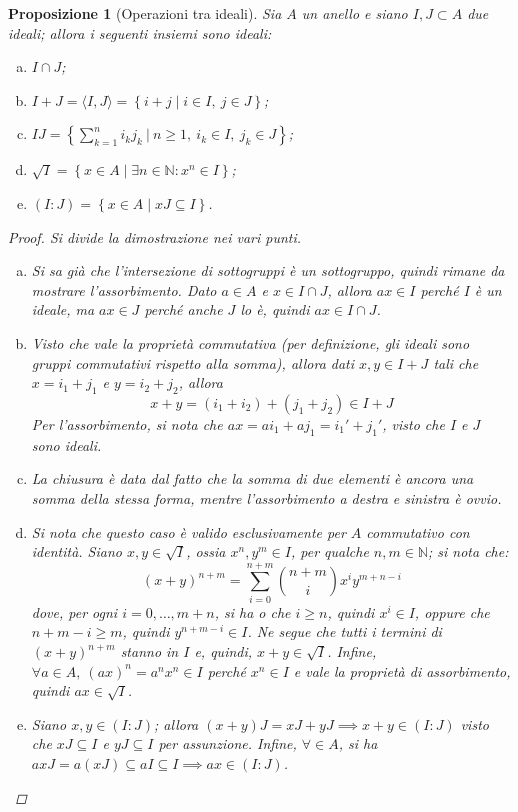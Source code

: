 \documentclass[12pt]{scrartcl}
\theoremstyle{style}
\newtheorem{prop}{Proposizione}[section]
\numberwithin{equation}{subsection}
\begin{document}
\begin{prop}
	[Operazioni tra ideali]
	Sia $A$ un anello e siano $I,J \subset A$ due ideali; allora i seguenti insiemi sono ideali:
	\begin{enumerate}[(a).]
		\item $I\cap J$;
		\item $I+J = \langle I,J \rangle = \left\{ i + j  \mid i \in I, \ j \in J \right\} $;
		\item $IJ = \left\{ \sum_{k=1}^{n} i_k j_k\ \Big\lvert\ n\ge 1,\ i_k \in I, \ j_k \in J \right\} $;
		\item $\sqrt{I} = \left\{ x \in A  \mid \exists n \in \mathbb{N} : x^n \in I \right\} $;
		\item $(I:J) = \left\{ x \in A  \mid  xJ \subseteq I \right\} $.
	\end{enumerate}
	\begin{proof}
		Si divide la dimostrazione nei vari punti.
		\begin{enumerate}[(a).]
			\item Si sa gi\`a che l'intersezione di sottogruppi \`e un sottogruppo, quindi rimane da mostrare l'assorbimento.
				Dato $a \in A$ e $x \in I \cap J$, allora $ax \in I$ perch\'e $I$ \`e un ideale, ma $ax \in J$ perch\'e anche $J$ lo \`e, quindi $ax \in I \cap J$.
			\item Visto che vale la propriet\`a commutativa (per definizione, gli ideali sono gruppi commutativi rispetto alla somma), allora dati $x, y \in I+J$ tali che $x = i_1 + j_1$ e $y = i_2+j_2$, allora
				\[
				x + y = (i_1+i_2)+(j_1+j_2) \in I+J
				\] 
				Per l'assorbimento, si nota che $ax = ai_1 + aj_1 = i_1' + j_1'$, visto che $I$ e $J$ sono ideali.
			\item La chiusura \`e data dal fatto che la somma di due elementi \`e ancora una somma della stessa forma, mentre l'assorbimento a destra e sinistra \`e ovvio.
			\item Si nota che questo caso \`e valido esclusivamente per $A$ commutativo con identit\`a.
				Siano $x,y \in \sqrt{I} $, ossia $x^n , y ^m \in I$, per qualche $n,m\in \mathbb{N}$; si nota che:
				\[
					(x+y)^{n+m} = \sum_{i=0}^{n+m} \binom{n+m}{i} x^i y^{m+n - i}
				\] 
				dove, per ogni $i= 0,\ldots,m+n$, si ha o che $i\ge n$, quindi $x^i \in I$, oppure che $n+m -i \ge m$, quindi $y^{n+m-i } \in I$.
				Ne segue che tutti i termini di $(x+y)^{n+m} $ stanno in $I$ e, quindi, $x+y \in \sqrt{I} $.
				Infine, $\forall  a \in A,\ (ax)^n = a^n x^n \in I$ perch\'e $x^n \in I$ e vale la propriet\`a di assorbimento, quindi $ax \in \sqrt{I} $.
			\item Siano $x,y \in (I:J)$; allora $(x+y) J = xJ + yJ \implies x+y \in (I:J)$ visto che $xJ \subseteq I$ e $yJ \subseteq I$ per assunzione.
				Infine, $\forall  \in A$, si ha $axJ = a(xJ) \subseteq aI \subseteq I \implies ax \in (I:J)$.
		\end{enumerate}
	\end{proof}
\end{prop}
\end{document}
